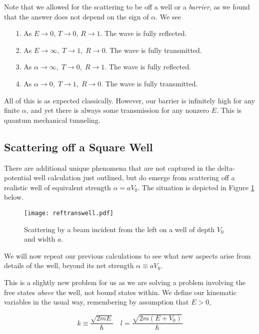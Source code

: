Note that we allowed for the scattering to be off a well or a \textit{barrier},
as we found that the answer does not depend on the sign of $\alpha$. We see 

\begin{itemize}
  \item[1.] As $E \rightarrow 0$, $T \rightarrow 0$, $R \rightarrow 1$. The
    wave is fully reflected. 
  \item[2.] As $E\rightarrow \infty, \; T \rightarrow 1, \; R \rightarrow 0$. The
    wave is fully transmitted. 
  \item[3.] As $\alpha \rightarrow \infty, \; T \rightarrow 0,\;  R \rightarrow 1$.
    The wave is fully reflected. 
  \item[4.] As  $\alpha \rightarrow 0,\;  T \rightarrow 1,\;  R \rightarrow 0$. The
    wave is fully transmitted.
\end{itemize}

All of this is as expected classically. However, our barrier is infinitely high
for any finite $\alpha$, and yet there is always some transmission for any
nonzero $E$. This is quantum mechanical tunneling. 


\subsection{Scattering off a Square Well} 

There are additional unique phenomena that are not captured in the
delta-potential well calculation just outlined, but do emerge from scattering
off a realistic well of equivalent strength $\alpha = aV_0$. The situation is
depicted in Figure \ref{reftranswell} below. 


\begin{figure}[H]
  \centering
    \texttt{[image: reftranswell.pdf]}
    \caption{Scattering by a beam incident from the left on a well of depth
    $V_0$ and width $a$.}
    \label{reftranswell}
\end{figure}


We will now repeat our previous calculations to see what new aspects arise from
details of the well, beyond its net strength $\alpha \equiv aV_0$. 

This is a slightly new problem for us as we are solving a problem involving the
free states \textit{above} the well, not bound states within. We define our
kinematic variables in the usual way, remembering by assumption that $E > 0$, 

\[
k \equiv \frac{\sqrt{2mE}}{\hbar} \quad l = \frac{\sqrt{2m(E+V_0)}}{\hbar}
\] \vspace{3px}


